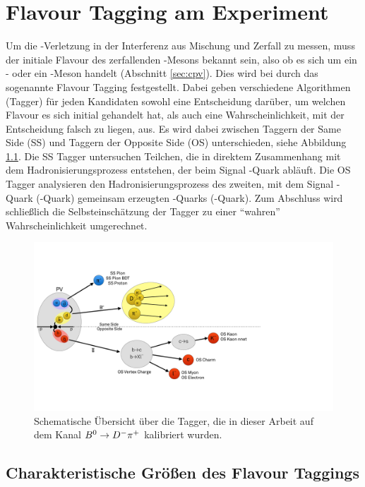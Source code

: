 \chapter{Flavour Tagging am \lhcb Experiment}

Um die \CP-Verletzung in der Interferenz aus Mischung und Zerfall zu messen, muss der initiale Flavour des zerfallenden \B-Mesons bekannt sein, also ob es sich um ein \Bz- oder ein \Bzb-Meson handelt (Abschnitt \ref{sec:cpv}). Dies wird bei \lhcb durch das sogenannte Flavour Tagging festgestellt. Dabei geben verschiedene Algorithmen (Tagger) für jeden Kandidaten sowohl eine Entscheidung darüber, um welchen Flavour es sich initial gehandelt hat, als auch eine Wahrscheinlichkeit, mit der Entscheidung falsch zu liegen, aus. Es wird dabei zwischen Taggern der Same Side (SS) und Taggern der Opposite Side (OS) unterschieden, siehe Abbildung \ref{fig:flavourtagging}. Die SS Tagger untersuchen Teilchen, die in direktem Zusammenhang mit dem Hadronisierungsprozess entstehen, der beim Signal \bquark-Quark abläuft. Die OS Tagger analysieren den Hadronisierungsprozess des zweiten, mit dem Signal \bquark-Quark (\bquarkbar-Quark) gemeinsam erzeugten \bquarkbar-Quarks (\bquark-Quark). Zum Abschluss wird schließlich die Selbsteinschätzung der Tagger zu einer \enquote{wahren} Wahrscheinlichkeit umgerechnet. 
\begin{figure}[htpb]
	\centering
		\includegraphics[width=\textwidth]{fig/FT_schema.pdf}
	\caption{Schematische Übersicht über die Tagger, die in dieser Arbeit auf dem Kanal ${{B}^0}\rightarrow D^-\pi^+$ kalibriert wurden.}
	\label{fig:flavourtagging} 
\end{figure}   

\section{Charakteristische Größen des Flavour Taggings}\label{sec:FTgrosse}

